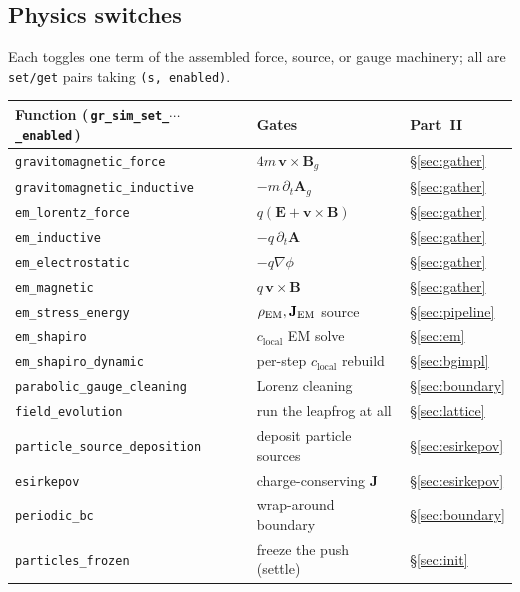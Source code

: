 \documentclass[11pt]{article}
\newcommand{\Ag}{\mathbf{A}_g}             %
\newcommand{\vv}[1]{\mathbf{#1}}           %
\newcommand{\clocal}{c_{\mathrm{local}}}
\newcommand{\Bg}{\vv{B}_g}
\begin{document}
\subsection{Physics switches}
Each toggles one term of the assembled force, source, or gauge machinery; all are
\texttt{set/get} pairs taking \texttt{(s, enabled)}.

\nopagebreak
{\footnotesize
\begin{tabular}{@{}F{8.2cm}L{4.9cm}L{1.4cm}@{}}
\toprule
\textbf{Function (\,\texttt{gr\_sim\_set\_}$\cdots$\texttt{\_enabled}\,)} & \textbf{Gates} & \textbf{Part~II} \\
\midrule
\texttt{gravitomagnetic\_force} & $4m\,\vv v\times\Bg$ & \S\ref{sec:gather} \\
\texttt{gravitomagnetic\_inductive} & $-m\,\partial_t\Ag$ & \S\ref{sec:gather} \\
\texttt{em\_lorentz\_force} & $q(\vv E+\vv v\times\vv B)$ & \S\ref{sec:gather} \\
\texttt{em\_inductive} & $-q\,\partial_t\vv A$ & \S\ref{sec:gather} \\
\texttt{em\_electrostatic} & $-q\nabla\phi$ & \S\ref{sec:gather} \\
\texttt{em\_magnetic} & $q\,\vv v\times\vv B$ & \S\ref{sec:gather} \\
\texttt{em\_stress\_energy} & $\rho_{\rm EM},\vv J_{\rm EM}$ source & \S\ref{sec:pipeline} \\
\texttt{em\_shapiro} & $\clocal$ EM solve & \S\ref{sec:em} \\
\texttt{em\_shapiro\_dynamic} & per-step $\clocal$ rebuild & \S\ref{sec:bgimpl} \\
\texttt{parabolic\_gauge\_cleaning} & Lorenz cleaning & \S\ref{sec:boundary} \\
\texttt{field\_evolution} & run the leapfrog at all & \S\ref{sec:lattice} \\
\texttt{particle\_source\_deposition} & deposit particle sources & \S\ref{sec:esirkepov} \\
\texttt{esirkepov} & charge-conserving $\vv J$ & \S\ref{sec:esirkepov} \\
\texttt{periodic\_bc} & wrap-around boundary & \S\ref{sec:boundary} \\
\texttt{particles\_frozen} & freeze the push (settle) & \S\ref{sec:init} \\
\bottomrule
\end{tabular}}
\end{document}
